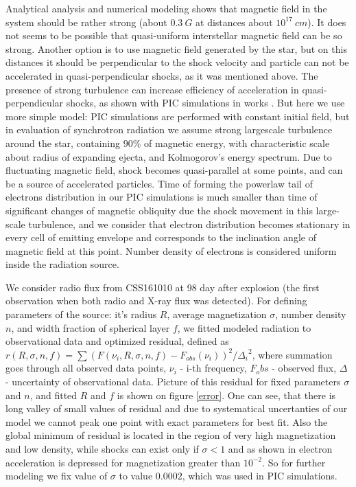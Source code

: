 \documentclass{article}
\begin{document}
	Analytical analysis \cite{Coppejans2020} and numerical modeling \cite{BykovUniverse} shows that magnetic field in the system should be rather strong (about $0.3~G$ at distances about $10^{17}~cm$). It does not seems to be possible that quasi-uniform interstellar magnetic field can be so strong. Another option is to use magnetic field generated by the star, but on this distances it should be perpendicular to the shock velocity \cite{Parker} and particle can not be accelerated in quasi-perpendicular shocks, as it was mentioned above. The presence of strong turbulence can increase efficiency of acceleration in quasi-perpendicular shocks, as shown with PIC simulations in works \cite{Demidem2023inhomogenousshock, Bresci2023turbulentchock, Romansky2019turbulence}. But here we use more simple model: PIC simulations are performed with constant initial field, but in evaluation of synchrotron radiation we assume strong largescale turbulence around the star, containing $90 \%$ of magnetic energy, with characteristic scale about radius of expanding ejecta, and Kolmogorov's energy spectrum. Due to fluctuating magnetic field, shock becomes quasi-parallel at some points, and can be a source of accelerated particles. Time of forming the powerlaw tail of electrons distribution in our PIC simulations is much smaller than time of significant changes of magnetic obliquity due the shock movement in this large-scale turbulence, and we consider that electron distribution becomes stationary in every cell of emitting envelope and corresponds to the inclination angle of magnetic field at this point. Number density of electrons is considered uniform inside the radiation source.
	
	We consider radio flux from CSS161010 at 98 day after explosion (the first observation when both radio and X-ray flux was detected). For defining parameters of the source: it's radius $R$, average magnetization $\sigma$, number density $n$, and width fraction of spherical layer $f$, we fitted modeled radiation to observational data and optimized residual, defined as $r(R, \sigma, n, f) = \sum (F(\nu_i, R, \sigma, n, f) - F_{obs}(\nu_i))^2/{\Delta_i}^2$, where summation goes through all observed data points, $\nu_i$ - i-th frequency, $F_obs$ - observed flux, $\Delta$ - uncertainty of observational data. Picture of this residual for fixed parameters $\sigma$ and $n$, and fitted $R$ and $f$ is shown on figure \ref{error}. One can see, that there is long valley of small values of residual and due to systematical uncertanties of our model we cannot peak one point with exact parameters for best fit. Also the global minimum of residual is located in the region of very high magnetization and low density, while shocks can exist only if $\sigma < 1$ \cite{?} and as shown in \cite{Sironi2011magnetization, Lemoine2014} electron acceleration is depressed for magnetization greater than $10^{-2}$. So for further modeling we fix value of $\sigma$ to value $0.0002$, which was used in PIC simulations.
	
\end{document}

